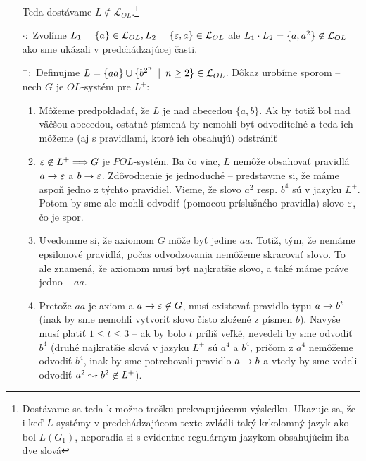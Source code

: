 \begin{dokaz}
\begin{itemize}
        Teda dostávame $L\not\in\mathcal{L}_{OL}$.\footnote{Dostávame sa
        teda k možno trošku prekvapujúcemu výsledku. Ukazuje sa, že i keď
        $L$-systémy v predchádzajúcom texte zvládli taký krkolomný jazyk
        ako bol $L(G_{1})$, neporadia si s evidentne regulárnym jazykom
        obsahujúcim iba dve slová}

    \item[$\cdot:$] Zvolíme $L_1=\{a\}\in \mathcal{L}_{OL},
        L_2=\{\varepsilon,a\}\in\mathcal{L}_{OL}$ ale $L_1 \cdot
        L_2=\{a,a^2\}\not\in \mathcal{L}_{OL}$ ako sme ukázali v
        predchádzajúcej časti.

    \item[$ ^+:$] Definujme 
        $L=\{aa\} \cup \{ b^{2^n} \enspace |\enspace n \ge 2 \}
            \in\mathcal{L}_{OL}$. Dôkaz urobíme sporom -- nech $G$ je
        $OL$-systém pre $L^{+}$:

        \begin{enumerate}
        \item Môžeme predpokladať, že $L$ je nad abecedou $\{a,b\}$.
            Ak by totiž bol nad väčšou abecedou, ostatné písmená
            by nemohli byť odvoditeľné a teda ich môžeme (aj s
            pravidlami, ktoré ich obsahujú) odstrániť

        \item $\varepsilon \not \in L^{+} \Longrightarrow G$ je $POL$-systém. Ba čo
            viac, $L$ nemôže obsahovať pravidlá $a \rightarrow \varepsilon$ a
            $b \rightarrow \varepsilon$. Zdôvodnenie je jednoduché --
            predstavme si, že máme aspoň jedno z týchto pravidiel.
            Vieme, že slovo $a^2$ resp. $b^4$ sú v jazyku $L^{+}$.
            Potom by sme ale mohli odvodiť (pomocou príslušného
            pravidla) slovo $\varepsilon$, čo je spor.

        \item Uvedomme si, že axiomom $G$ môže byť jedine $aa$.
            Totiž, tým, že nemáme epsilonové pravidlá,
            počas odvodzovania nemôžeme skracovať slovo.
            To ale znamená, že axiomom musí byť najkratšie slovo, a
            také máme práve jedno -- $aa$.


        \item Pretože $aa$ je axiom a $a \rightarrow \varepsilon \not \in G$,
            musí existovať pravidlo typu
            $a\rightarrow b^t$ (inak by sme nemohli vytvoriť
            slovo čisto zložené z písmen $b$).
            Navyše musí platiť $1 \le t\le 3$ -- ak by bolo $t$ príliš
            veľké, nevedeli by sme odvodiť $b^4$ (druhé najkratšie
            slová v jazyku $L^{+}$ sú $a^4$ a $b^4$,
            pričom z $a^4$ nemôžeme odvodiť $b^4$, inak by sme
            potrebovali pravidlo $a \rightarrow b$ a vtedy by sme vedeli
            odvodiť $a^2 \leadsto b^2 \not \in L^{+}$).


\end{enumerate}
\end{itemize}
\end{dokaz}
